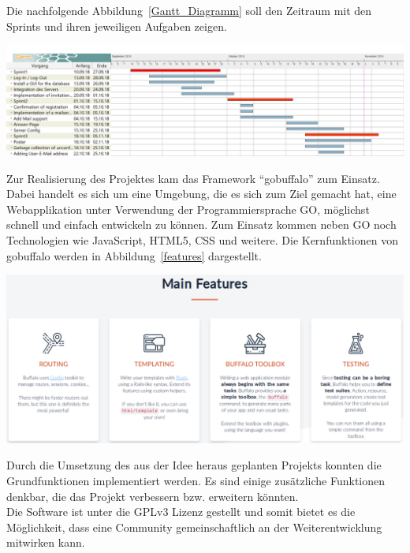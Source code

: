 \documentclass[landscape,a0paper,fontscale=0.35]{baposter} %
\begin{document}
\begin{poster}
{	Die nachfolgende Abbildung~\ref{Gantt_Diagramm} soll den Zeitraum mit den Sprints und ihren jeweiligen Aufgaben zeigen.
	\begin{center}
		\includegraphics[width=0.7\linewidth]{GanttDiagramm.PNG}
		\label{Gantt_Diagramm}
	\end{center}
}


{
	Zur Realisierung des Projektes kam das Framework \enquote{gobuffalo} zum Einsatz. Dabei handelt es sich um eine Umgebung, die es sich zum Ziel gemacht hat, eine Webapplikation unter Verwendung der Programmiersprache GO, möglichst schnell und einfach entwickeln zu können. Zum Einsatz kommen neben GO noch Technologien wie JavaScript, HTML5, CSS und weitere. Die Kernfunktionen von gobuffalo werden in Abbildung~\ref{features} dargestellt.
	\begin{center}
		\includegraphics[width=0.91\linewidth]{buffalo_features.png}
		\label{features}
	\end{center}
}


{
	Durch die Umsetzung des aus der Idee heraus geplanten Projekts konnten die Grundfunktionen implementiert werden. Es sind einige zusätzliche Funktionen denkbar, die das Projekt verbessern bzw. erweitern könnten.\\
	Die Software ist unter die GPLv3 Lizenz gestellt und somit bietet es die Möglichkeit, dass eine Community gemeinschaftlich an der Weiterentwicklung mitwirken kann.

}
\end{poster}
\end{document}
